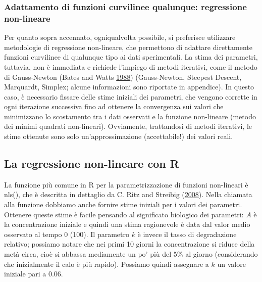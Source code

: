 \documentclass[a4paper,12pt,oneside]{book}
\theoremstyle{definition}
\theoremstyle{definition}
\theoremstyle{definition}
\theoremstyle{remark}
\begin{document}
\subsubsection{Adattamento di funzioni curvilinee qualunque: regressione
non-lineare}\label{adattamento-di-funzioni-curvilinee-qualunque-regressione-non-lineare}

Per quanto sopra accennato, ogniqualvolta possibile, si preferisce
utilizzare metodologie di regressione non-lineare, che permettono di
adattare direttamente funzioni curvilinee di qualunque tipo ai dati
sperimentali. La stima dei parametri, tuttavia, non è immediata e
richiede l'impiego di metodi iterativi, come il metodo di Gauss-Newton
(Bates and Watts
\protect\hyperlink{ref-bates1988_Nonlinearregressionanalysis}{1988})
(Gauss-Newton, Steepest Descent, Marquardt, Simplex; alcune informazioni
sono riportate in appendice). In questo caso, è necessario fissare delle
stime iniziali dei parametri, che vengono corrette in ogni iterazione
successiva fino ad ottenere la convergenza sui valori che minimizzano lo
scostamento tra i dati osservati e la funzione non-lineare (metodo dei
minimi quadrati non-lineari). Ovviamente, trattandosi di metodi
iterativi, le stime ottenute sono solo un'approssimazione (accettabile!)
dei valori reali.

\subsection{La regressione non-lineare con
R}\label{la-regressione-non-lineare-con-r}

La funzione più comune in R per la parametrizzazione di funzioni
non-lineari è nls(), che è descritta in dettaglio da C. Ritz and
Streibig (\protect\hyperlink{ref-ritz2008_Nonlinearregression}{2008}).
Nella chiamata alla funzione dobbiamo anche fornire stime iniziali per i
valori dei parametri. Ottenere queste stime è facile pensando al
significato biologico dei parametri: \(A\) è la concentrazione iniziale
e quindi una stima ragionevole è data dal valor medio osservato al tempo
0 (100). Il parametro \(k\) è invece il tasso di degradazione relativo;
possiamo notare che nei primi 10 giorni la concentrazione si riduce
della metà circa, cioè si abbassa mediamente un po' più del 5\% al
giorno (considerando che inizialmente il calo è più rapido). Possiamo
quindi assegnare a \(k\) un valore iniziale pari a 0.06.
\end{document}
